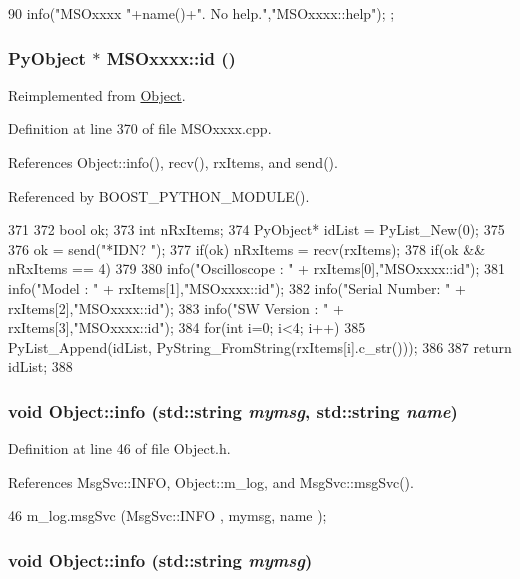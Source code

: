 \begin{DoxyCode}
90 { info("MSOxxxx "+name()+". No help.","MSOxxxx::help"); };
\end{DoxyCode}
\hypertarget{classMSOxxxx_a0f14b23d31d8e7647184e99a89600cc3}{
\subsubsection[{id}]{\setlength{\rightskip}{0pt plus 5cm}PyObject $\ast$ MSOxxxx::id ()}}
\label{classMSOxxxx_a0f14b23d31d8e7647184e99a89600cc3}


Reimplemented from \hyperlink{classObject_af99145335cc61ff6e2798ea17db009d2}{Object}.

Definition at line 370 of file MSOxxxx.cpp.

References Object::info(), recv(), rxItems, and send().

Referenced by BOOST\_\-PYTHON\_\-MODULE().


\begin{DoxyCode}
371 {   
372     bool ok;
373     int nRxItems;
374     PyObject* idList = PyList_New(0);
375     
376     ok = send("*IDN? \n");
377     if(ok)  nRxItems = recv(rxItems);
378     if(ok && nRxItems == 4)
379     {
380         info("Oscilloscope : " + rxItems[0],"MSOxxxx::id");
381         info("Model        : " + rxItems[1],"MSOxxxx::id");
382         info("Serial Number: " + rxItems[2],"MSOxxxx::id");
383         info("SW Version   : " + rxItems[3],"MSOxxxx::id");
384         for(int i=0; i<4; i++)
385             PyList_Append(idList, PyString_FromString(rxItems[i].c_str()));
386     }
387     return idList;
388 }
\end{DoxyCode}
\hypertarget{classObject_a1ca123253dfd30fc28b156f521dcbdae}{
\subsubsection[{info}]{\setlength{\rightskip}{0pt plus 5cm}void Object::info (std::string {\em mymsg}, \/  std::string {\em name})}}
\label{classObject_a1ca123253dfd30fc28b156f521dcbdae}


Definition at line 46 of file Object.h.

References MsgSvc::INFO, Object::m\_\-log, and MsgSvc::msgSvc().


\begin{DoxyCode}
46 { m_log.msgSvc (MsgSvc::INFO    , mymsg, name ); }
\end{DoxyCode}
\hypertarget{classObject_a644fd329ea4cb85f54fa6846484b84a8}{
\subsubsection[{info}]{\setlength{\rightskip}{0pt plus 5cm}void Object::info (std::string {\em mymsg})}}
\label{classObject_a644fd329ea4cb85f54fa6846484b84a8}


